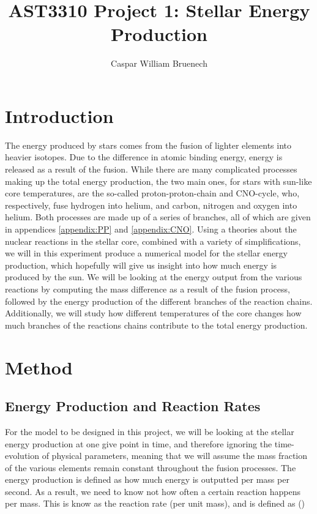 \documentclass[a4paper,10pt,english]{article}
\title{AST3310 Project 1: Stellar Energy Production}
\author{Caspar William Bruenech}
\begin{document}
\maketitle

\section{Introduction}

 The energy produced by stars comes from the fusion of lighter elements into heavier isotopes. Due to the difference in atomic binding energy, energy is released as a result of the fusion. While there are many complicated processes making up the total energy production, the two main ones, for stars with sun-like core temperatures, are the so-called proton-proton-chain and CNO-cycle, who, respectively, fuse hydrogen into helium, and carbon, nitrogen and oxygen into helium. Both processes are made up of a series of branches, all of which are given in appendices \ref{appendix:PP} and \ref{appendix:CNO}. Using a theories about the nuclear reactions in the stellar core, combined with a variety of simplifications, we will in this experiment produce a numerical model for the stellar energy production, which hopefully will give us insight into how much energy is produced by the sun. We will be looking at the energy output from the various reactions by computing the mass difference as a result of the fusion process, followed by the energy production of the different branches of the reaction chains. Additionally, we will study how different temperatures of the core changes how much branches of the reactions chains contribute to the total energy production.

\section{Method}

\subsection{Energy Production and Reaction Rates}

 For the model to be designed in this project, we will be looking at the stellar energy production at one give point in time, and therefore ignoring the time-evolution of physical parameters, meaning that we will assume the mass fraction of the various elements remain constant throughout the fusion processes. The energy production is defined as how much energy is outputted per mass per second. As a result, we need to know not how often a certain reaction happens per mass. This is know as the reaction rate (per unit mass), and is defined as (\cite{Gudiksen2015})
\end{document}

